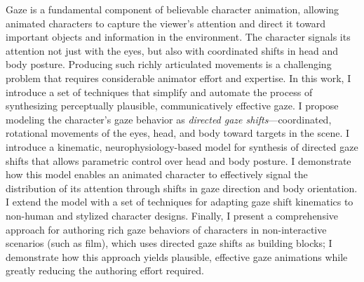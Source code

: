 Gaze is a fundamental component of believable character animation, allowing animated characters to capture the viewer’s attention and direct it toward important objects and information in the environment. The character signals its attention not just with the eyes, but also with coordinated shifts in head and body posture. Producing such richly articulated movements is a challenging problem that requires considerable animator effort and expertise. In this work, I introduce a set of techniques that simplify and automate the process of synthesizing perceptually plausible, communicatively effective gaze. I propose modeling the character’s gaze behavior as \emph{directed gaze shifts}---coordinated, rotational movements of the eyes, head, and body toward targets in the scene. I introduce a kinematic, neurophysiology-based model for synthesis of directed gaze shifts that allows parametric control over head and body posture. I demonstrate how this model enables an animated character to effectively signal the distribution of its attention through shifts in gaze direction and body orientation. I extend the model with a set of techniques for adapting gaze shift kinematics to non-human and stylized character designs. Finally, I present a comprehensive approach for authoring rich gaze behaviors of characters in non-interactive scenarios (such as film), which uses directed gaze shifts as building blocks; I demonstrate how this approach yields plausible, effective gaze animations while greatly reducing the authoring effort required.
